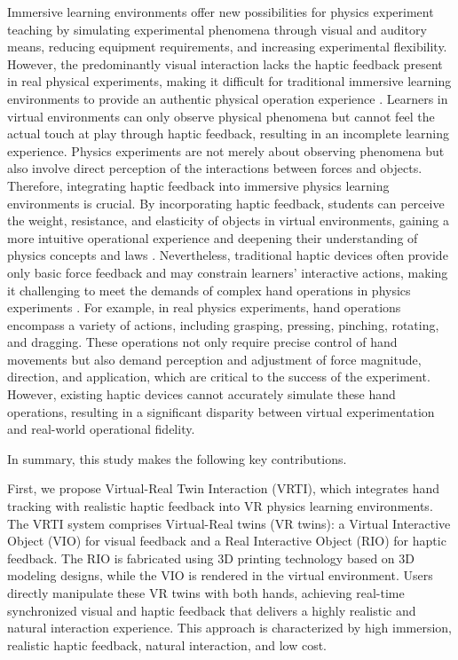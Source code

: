 \documentclass[sigconf,review,anonymous]{acmart}
\begin{document}
Immersive learning environments offer new possibilities for physics experiment teaching by simulating experimental phenomena through visual and auditory means, reducing equipment requirements, and increasing experimental flexibility. However, the predominantly visual interaction lacks the haptic feedback present in real physical experiments, making it difficult for traditional immersive learning environments to provide an authentic physical operation experience \cite{giri2021application}. Learners in virtual environments can only observe physical phenomena but cannot feel the actual touch at play through haptic feedback, resulting in an incomplete learning experience. Physics experiments are not merely about observing phenomena but also involve direct perception of the interactions between forces and objects. Therefore, integrating haptic feedback into immersive physics learning environments is crucial. By incorporating haptic feedback, students can perceive the weight, resistance, and elasticity of objects in virtual environments, gaining a more intuitive operational experience and deepening their understanding of physics concepts and laws \cite{minaker2016handson}. Nevertheless, traditional haptic devices often provide only basic force feedback and may constrain learners' interactive actions, making it challenging to meet the demands of complex hand operations in physics experiments \cite{bonfert2023challenges}. For example, in real physics experiments, hand operations encompass a variety of actions, including grasping, pressing, pinching, rotating, and dragging. These operations not only require precise control of hand movements but also demand perception and adjustment of force magnitude, direction, and application, which are critical to the success of the experiment. However, existing haptic devices cannot accurately simulate these hand operations, resulting in a significant disparity between virtual experimentation and real-world operational fidelity.

In summary, this study makes the following key contributions.

First, we propose Virtual-Real Twin Interaction (VRTI), which integrates hand tracking with realistic haptic feedback into VR physics learning environments. The VRTI system comprises Virtual-Real twins (VR twins): a Virtual Interactive Object (VIO) for visual feedback and a Real Interactive Object (RIO) for haptic feedback. The RIO is fabricated using 3D printing technology based on 3D modeling designs, while the VIO is rendered in the virtual environment. Users directly manipulate these VR twins with both hands, achieving real-time synchronized visual and haptic feedback that delivers a highly realistic and natural interaction experience. This approach is characterized by high immersion, realistic haptic feedback, natural interaction, and low cost.
\end{document}
